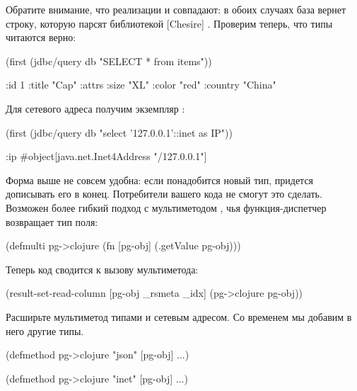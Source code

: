 Обратите внимание, что реализации  и  совпадают: в обоих случаях база вернет строку, которую парсят библиотекой [Chesire] . Проверим теперь, что типы читаются верно:

\begin{english}
  \begin{clojure}
(first (jdbc/query db "SELECT * from items"))

{:id 1 :title "Cap"
 :attrs {:size "XL" :color "red" :country "China"}}
  \end{clojure}
\end{english}

Для сетевого адреса получим экземпляр :

\begin{english}
  \begin{clojure}
(first (jdbc/query db "select '127.0.0.1'::inet as IP"))

{:ip #object[java.net.Inet4Address "/127.0.0.1"]}
  \end{clojure}
\end{english}

Форма  выше не совсем удобна: если понадобится новый тип, придется дописывать его в конец. Потребители вашего кода не смогут это сделать. Возможен более гибкий подход с мультиметодом , чья функция-диспетчер возвращает тип поля:

\begin{english}
  \begin{clojure}
(defmulti pg->clojure (fn [pg-obj]
                        (.getValue pg-obj)))
  \end{clojure}
\end{english}

Теперь код  сводится к вызову мультиметода:

\begin{english}
  \begin{clojure}
(result-set-read-column [pg-obj _rsmeta _idx]
  (pg->clojure pg-obj))
  \end{clojure}
\end{english}

Расширьте мультиметод типами  и сетевым адресом. Со временем мы добавим в него другие типы.

\begin{english}
  \begin{clojure}
(defmethod pg->clojure "json"
  [pg-obj] ...)

(defmethod pg->clojure "inet"
  [pg-obj] ...)
  \end{clojure}
\end{english}


